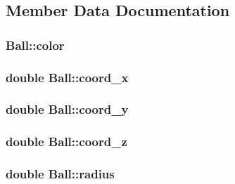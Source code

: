 \subsection{Member Data Documentation}
\hypertarget{classBall_aaf859de645927ea78ef1defae263ba09}{
\subsubsection[{color}]{ Ball\+::color\hspace{0.3cm}{\ttfamily [private]}}}\label{classBall_aaf859de645927ea78ef1defae263ba09}
\hypertarget{classBall_a6d5a7aacffad1248080398f2d6540fe0}{
\subsubsection[{coord\+\_\+x}]{\setlength{\rightskip}{0pt plus 5cm}double Ball\+::coord\+\_\+x\hspace{0.3cm}{\ttfamily [private]}}}\label{classBall_a6d5a7aacffad1248080398f2d6540fe0}
\hypertarget{classBall_ad65b08abc2b3d8ab7e51f0dc41b6ea08}{
\subsubsection[{coord\+\_\+y}]{\setlength{\rightskip}{0pt plus 5cm}double Ball\+::coord\+\_\+y\hspace{0.3cm}{\ttfamily [private]}}}\label{classBall_ad65b08abc2b3d8ab7e51f0dc41b6ea08}
\hypertarget{classBall_ab5297ae361c4310f2aa84c1b602293a0}{
\subsubsection[{coord\+\_\+z}]{\setlength{\rightskip}{0pt plus 5cm}double Ball\+::coord\+\_\+z\hspace{0.3cm}{\ttfamily [private]}}}\label{classBall_ab5297ae361c4310f2aa84c1b602293a0}
\hypertarget{classBall_ae75638f44296592c288bf7c87590fee0}{
\subsubsection[{radius}]{\setlength{\rightskip}{0pt plus 5cm}double Ball\+::radius\hspace{0.3cm}{\ttfamily [private]}}}\label{classBall_ae75638f44296592c288bf7c87590fee0}
